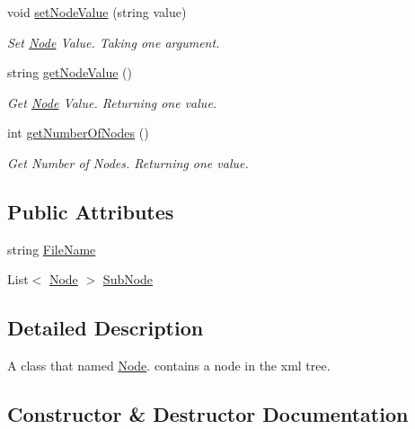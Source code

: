 \begin{DoxyCompactItemize}
void \mbox{\hyperlink{class_animal_change_1_1_node_a26766ab5a8c12f560f96ce7253273b77}{set\+Node\+Value}} (string value)
\begin{DoxyCompactList}\small\item\em Set \mbox{\hyperlink{class_animal_change_1_1_node}{Node}} Value. Taking one argument. \end{DoxyCompactList}\item 
string \mbox{\hyperlink{class_animal_change_1_1_node_a3d72b6b2f442dcb1254eacdbb45c5d5d}{get\+Node\+Value}} ()
\begin{DoxyCompactList}\small\item\em Get \mbox{\hyperlink{class_animal_change_1_1_node}{Node}} Value. Returning one value. \end{DoxyCompactList}\item 
int \mbox{\hyperlink{class_animal_change_1_1_node_aa796b68392c237af7808a15c01c384c0}{get\+Number\+Of\+Nodes}} ()
\begin{DoxyCompactList}\small\item\em Get Number of Nodes. Returning one value. \end{DoxyCompactList}\end{DoxyCompactItemize}
\subsection*{Public Attributes}
\begin{DoxyCompactItemize}
\item 
string \mbox{\hyperlink{class_animal_change_1_1_node_a749e8e44c92c916434a3652073c9a5f0}{File\+Name}}
\item 
List$<$ \mbox{\hyperlink{class_animal_change_1_1_node}{Node}} $>$ \mbox{\hyperlink{class_animal_change_1_1_node_af7065c690421627793167f33cbb8d4e2}{Sub\+Node}}
\end{DoxyCompactItemize}


\subsection{Detailed Description}
A class that named \mbox{\hyperlink{class_animal_change_1_1_node}{Node}}. contains a node in the xml tree. 

\subsection{Constructor \& Destructor Documentation}
\mbox{\label{class_animal_change_1_1_node_ab61b9908056398b7dbae90ef77d79f95}} 
